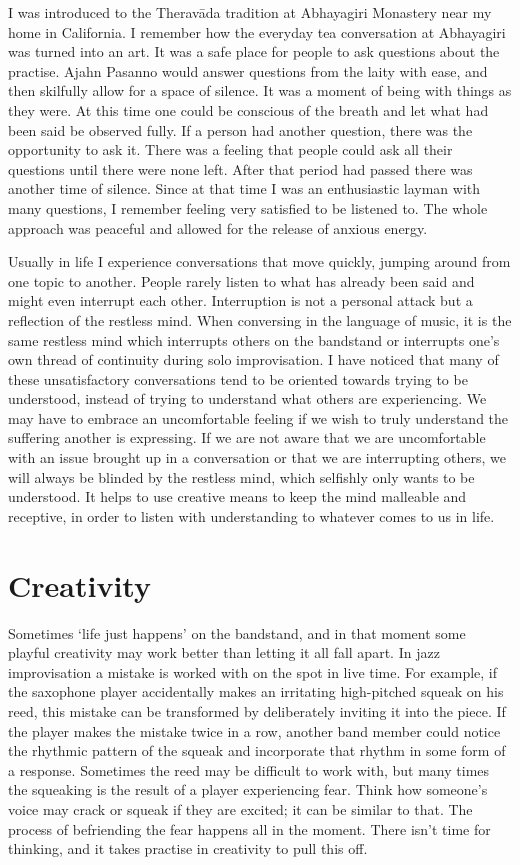 I was introduced to the Theravāda tradition at Abhayagiri Monastery near
my home in California. I remember how the everyday tea conversation at
Abhayagiri was turned into an art. It was a safe place for people to ask
questions about the practise. Ajahn Pasanno would answer questions from
the laity with ease, and then skilfully allow for a space of silence. It
was a moment of being with things as they were. At this time one could
be conscious of the breath and let what had been said be observed fully. 
If a person had another question, there was the opportunity to ask it. 
There was a feeling that people could ask all their questions until
there were none left. After that period had passed there was another
time of silence. Since at that time I was an enthusiastic layman with
many questions, I remember feeling very satisfied to be listened to. The
whole approach was peaceful and allowed for the release of anxious
energy. 

Usually in life I experience conversations that move quickly, jumping
around from one topic to another. People rarely listen to what has
already been said and might even interrupt each other. Interruption is
not a personal attack but a reflection of the restless mind. When
conversing in the language of music, it is the same restless mind which
interrupts others on the bandstand or interrupts one's own thread of
continuity during solo improvisation. I have noticed that many of these
unsatisfactory conversations tend to be oriented towards trying to be
understood, instead of trying to understand what others are
experiencing. We may have to embrace an uncomfortable feeling if we wish
to truly understand the suffering another is expressing. If we are not
aware that we are uncomfortable with an issue brought up in a
conversation or that we are interrupting others, we will always be
blinded by the restless mind, which selfishly only wants to be
understood. It helps to use creative means to keep the mind malleable
and receptive, in order to listen with understanding to whatever comes
to us in life. 

\section{Creativity}

Sometimes `life just happens' on the bandstand, and in that moment some
playful creativity may work better than letting it all fall apart. In
jazz improvisation a mistake is worked with on the spot in live time. 
For example, if the saxophone player accidentally makes an irritating
high-pitched squeak on his reed, this mistake can be transformed by
deliberately inviting it into the piece. If the player makes the mistake
twice in a row, another band member could notice the rhythmic pattern of
the squeak and incorporate that rhythm in some form of a response. 
Sometimes the reed may be difficult to work with, but many times the
squeaking is the result of a player experiencing fear. Think how
someone's voice may crack or squeak if they are excited; it can be
similar to that. The process of befriending the fear happens all in the
moment. There isn't time for thinking, and it takes practise in
creativity to pull this off. 


